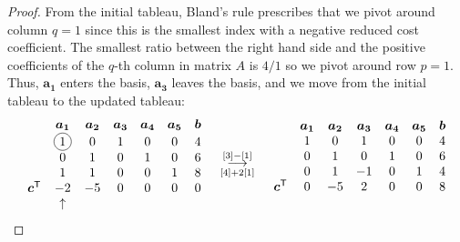 \documentclass[12pt]{article}
\newcommand*\circled[1]{\tikz[baseline=(char.base)]{
            \node[shape=circle,draw,inner sep=2pt] (char) {#1};}}
\theoremstyle{definition}
\newcommand{\vect}[1]{\boldsymbol{#1}}
\newcommand{\grstep}[2][\relax]{%
   \ensuremath{\mathrel{
       {\mathop{\longrightarrow}\limits^{#2\mathstrut}_{
                                     \begin{subarray}{l} #1 \end{subarray}}}}}}
\newcommand{\tran}{\mathsf{T}}
\begin{document}
\begin{proof}
  From the initial tableau, Bland's rule prescribes that we pivot around column
  $q=1$ since this is the smallest index with a negative reduced cost coefficient.
  The smallest ratio between the right hand side and the positive coefficients
  of the $q$-th column in matrix $A$ is $4/1$ so we pivot around row $p =1$. Thus, $\vect{a_1}$
  enters the basis, $\vect{a_3}$ leaves the basis, and we move from the initial tableau to the updated tableau:
  \begin{align*}
    \begin{matrix}
      & \vect{a_1} & \vect{a_2} & \vect{a_3} & \vect{a_4} & \vect{a_5} & \vect{b} \\
      & \circled{1} & 0 & 1 & 0 & 0 & 4 \\
      & 0 & 1 & 0 & 1 & 0 & 6 \\
      & 1 & 1 & 0 & 0 & 1 & 8 \\
      \vect{c}^\tran & -2 & -5  & 0 & 0 & 0 & 0 \\
      & \uparrow & & & & & \\
    \end{matrix}
    \quad
    \begin{array}{c}
    \grstep[{[4] + 2[1]}]{[3] - [1]} \\
    \end{array}
    \quad
    \begin{matrix}
      & \vect{a_1} & \vect{a_2} & \vect{a_3} & \vect{a_4} & \vect{a_5} & \vect{b} \\
                       & 1 & 0 & 1 & 0 & 0 & 4 \\
                       & 0 & 1 & 0 & 1 & 0 & 6 \\
                       & 0 & 1 & -1 & 0 & 1 & 4 \\
      \vect{c}^\tran & 0 & -5 & 2 & 0 & 0 & 8 \\
      & & & & & & \\
    \end{matrix}
  \end{align*}


\end{proof}
\end{document}
